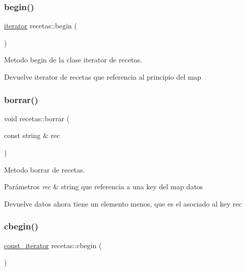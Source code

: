 \subsubsection{\texorpdfstring{begin()}{begin()}}
{\footnotesize\ttfamily \hyperlink{classrecetas_1_1iterator}{iterator} recetas\+::begin (\begin{DoxyParamCaption}{ }\end{DoxyParamCaption})\hspace{0.3cm}{\ttfamily [inline]}}



Metodo begin de la clase iterator de recetas. 

\begin{DoxyReturn}{Devuelve}
iterator de recetas que referencia al principio del map 
\end{DoxyReturn}
\mbox{\label{classrecetas_a52f721a2505cd731718bec3c2231cce7}} 
\subsubsection{\texorpdfstring{borrar()}{borrar()}}
{\footnotesize\ttfamily void recetas\+::borrar (\begin{DoxyParamCaption}\item[{const string \&}]{rec }\end{DoxyParamCaption})}



Metodo borrar de recetas. 


\begin{DoxyParams}{Parámetros}
{\em rec} & string que referencia a una key del map datos \\
\hline
\end{DoxyParams}
\begin{DoxyReturn}{Devuelve}
datos ahora tiene un elemento menos, que es el asociado al key rec 
\end{DoxyReturn}
\mbox{\label{classrecetas_affc2a9e77966eea6ad67b84fc60c6dff}} 
\subsubsection{\texorpdfstring{cbegin()}{cbegin()}}
{\footnotesize\ttfamily \hyperlink{classrecetas_1_1const__iterator}{const\+\_\+iterator} recetas\+::cbegin (\begin{DoxyParamCaption}{ }\end{DoxyParamCaption})\hspace{0.3cm}{\ttfamily [inline]}}



